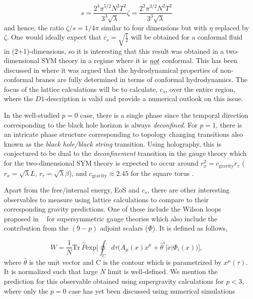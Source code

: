 \begin{equation}
s = \frac{2^4 \pi^{5/2} N^2 T^2}{3^3 \sqrt{\lambda}} 
\zeta = \frac{2^2 \pi^{3/2} N^2 T^2}{3^3 \sqrt{\lambda}} 
\end{equation}
and hence, the ratio $\zeta/s = 1/4\pi$ similar to four dimensions but with $\eta$ replaced by $\zeta$. 
One would ideally expect that $c_{s} = \sqrt{\frac{1}{2}}$ will be obtained for a conformal fluid in (2+1)-dimensions, 
so it is interesting that this result was obtained in a two-dimensional SYM theory in a regime where it is $\emph{not}$ conformal. 
This has been discussed in \cite{Kanitscheider:2009as} where it was argued that the hydrodynamical properties of non-conformal
branes are fully determined in terms of conformal hydrodynamics. The focus of the lattice calculations will be to calculate, $c_{s}$,
over the entire region, where the $D1$-description is valid and provide a numerical outlook on this issue. 

In the well-studied $p=0$ case, there is a single phase since the temporal direction corresponding to the 
black hole horizon is always \emph{deconfined}. For $p=1$, there is an intricate phase structure corresponding to topology changing 
transitions \cite{Gregory:1993vy} also known as the \emph{black hole/black string} transition. Using holography, 
this is conjectured to be dual to the \emph{deconfinement} transition in the gauge theory which for the two-dimensional SYM theory 
is expected to occur around  $r_{x}^2 = c_{\text{gravity}} r_{\tau}$ ($r_{x} = \sqrt{\lambda} L$, $r_{\tau} = \sqrt{\lambda} \beta$), 
and $c_{\text{gravity}} \approx 2.45$ for the square torus \cite{Catterall:2010fx, Dias:2017uyv}. 

Apart from the free/internal energy, EoS and $c_{s}$, there are other interesting observables to measure using 
lattice calculations to compare to
their corresponding gravity predictions. One of these include the Wilson loops proposed in 
~\cite{Rey:1998ik,Maldacena:1998im} for supersymmetric gauge 
theories which also include the contribution from the $(9-p)$ adjoint scalars ($\Phi$). It is defined as follows, 

\begin{equation}
W = \frac{1}{N} \mathrm{Tr} ~ \hat{P} \mathrm{exp} \Bigg[ \oint_C d\tau \Big (A_{\mu}(x) \dot{x}^{\mu} + \hat{\theta}^i|\dot{x}| \Phi_{i}(x)\Big)\Bigg] , 
\end{equation}
where \textbf{$\hat{\theta}$} is the unit vector and C is the contour which is parametrized by 
$x^{\mu}(\tau)$. It is normalized such that large $N$ limit is well-defined. 
We mention the prediction for this observable obtained using supergravity calculations for $ p < 3$, where 
only the $p=0$ case has yet been discussed using numerical simulations \cite{Hanada:2008gy}

